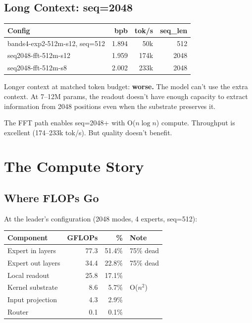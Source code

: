 \documentclass[11pt,a4paper]{report}
\begin{document}
\section{Long Context: seq=2048}

\begin{center}
\begin{tabular}{lrrr}
\toprule
Config & bpb & tok/s & seq\_len \\
\midrule
bands4-exp2-512m-s12, seq=512 & 1.894 & 50k & 512 \\
seq2048-fft-512m-s12 & 1.959 & 174k & 2048 \\
seq2048-fft-512m-s8 & 2.002 & 233k & 2048 \\
\bottomrule
\end{tabular}
\end{center}

Longer context at matched token budget: \textbf{worse.} The model can't use the extra context. At 7--12M params, the readout doesn't have enough capacity to extract information from 2048 positions even when the substrate preserves it.

The FFT path enables seq=2048+ with O($n \log n$) compute. Throughput is excellent (174--233k tok/s). But quality doesn't benefit.

\chapter{The Compute Story}

\section{Where FLOPs Go}

At the leader's configuration (2048 modes, 4 experts, seq=512):

\begin{center}
\begin{tabular}{lrrl}
\toprule
Component & GFLOPs & \% & Note \\
\midrule
Expert in layers & 77.3 & 51.4\% & 75\% dead \\
Expert out layers & 34.4 & 22.8\% & 75\% dead \\
Local readout & 25.8 & 17.1\% & \\
Kernel substrate & 8.6 & 5.7\% & O($n^2$) \\
Input projection & 4.3 & 2.9\% & \\
Router & 0.1 & 0.1\% & \\
\bottomrule
\end{tabular}
\end{center}
\end{document}
